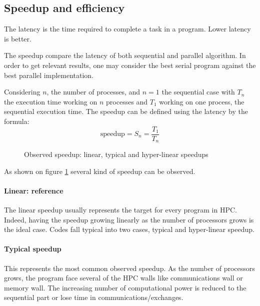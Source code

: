 \subsection{Speedup and efficiency}
The latency is the time required to complete a task in a program.
Lower latency is better. 

The speedup compare the latency of both sequential and parallel algorithm. 
In order to get relevant results, one may consider the best serial program against the best parallel implementation.

Considering $n$, the number of processes, and $n=1$ the sequential case with $T_n$ the execution time working on $n$ processes and $T_1$ working on one process, the sequential execution time. 
The speedup can be defined using the latency by the formula: 
\begin{equation}
\text{speedup} = S_n =  \frac{T_1}{T_n}
\end{equation}

\begin{figure}
\centering 
{}
\caption{Observed speedup: linear, typical and hyper-linear speedups}
\label{fig:1_HPC:speedup_obs}
\end{figure}

As shown on figure \ref{fig:1_HPC:speedup_obs} several kind of speedup can be observed. 
\paragraph{Linear: reference}
The linear speedup usually represents the target for every program in HPC. 
Indeed, having the speedup growing linearly as the number of processors grows is the ideal case. 
Codes fall typical into two cases, typical and hyper-linear speedup. 
\paragraph{Typical speedup}
This represents the most common observed speedup. 
As the number of processors grows, the program face several of the HPC walls like communications wall or memory wall. 
The increasing number of computational power is reduced to the sequential part or lose time in communications/exchanges. 
